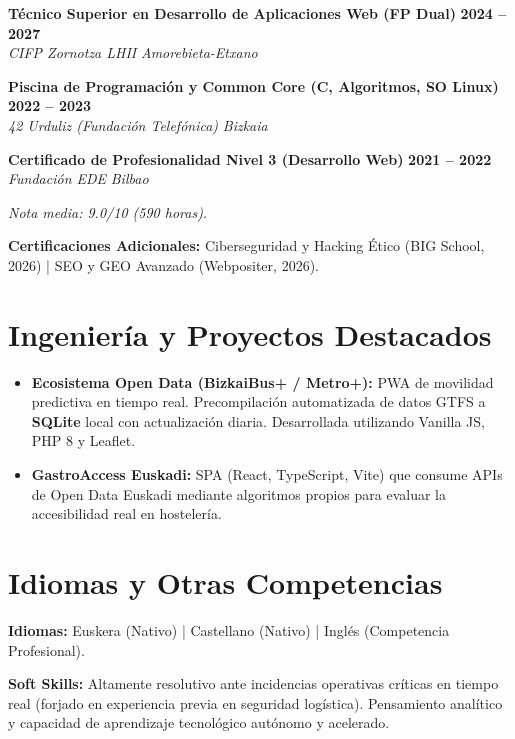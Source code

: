 \documentclass[a4paper,10pt]{article}
\newcommand{\jobheader}[4]{
    \noindent\textbf{#1} \hfill \textbf{#2} \\
    \textit{#3} \hfill \textit{#4} \vspace{3pt}
}
\begin{document}
\jobheader{Técnico Superior en Desarrollo de Aplicaciones Web (FP Dual)}{2024 -- 2027}{CIFP Zornotza LHII}{Amorebieta-Etxano}
\vspace{3pt}

\jobheader{Piscina de Programación y Common Core (C, Algoritmos, SO Linux)}{2022 -- 2023}{42 Urduliz (Fundación Telefónica)}{Bizkaia}
\vspace{3pt}

\jobheader{Certificado de Profesionalidad Nivel 3 (Desarrollo Web)}{2021 -- 2022}{Fundación EDE}{Bilbao}
\small \textit{Nota media: 9.0/10 (590 horas).}
\vspace{4pt}

\noindent \textbf{Certificaciones Adicionales:} Ciberseguridad y Hacking Ético (BIG School, 2026) | SEO y GEO Avanzado (Webpositer, 2026).

\section{Ingeniería y Proyectos Destacados}

\begin{itemize}[leftmargin=12pt, itemsep=4pt, topsep=4pt]
    \item \textbf{Ecosistema Open Data (BizkaiBus+ / Metro+):} PWA de movilidad predictiva en tiempo real. Precompilación automatizada de datos GTFS a \textbf{SQLite} local con actualización diaria. Desarrollada utilizando Vanilla JS, PHP 8 y Leaflet.
    \item \textbf{GastroAccess Euskadi:} SPA (React, TypeScript, Vite) que consume APIs de Open Data Euskadi mediante algoritmos propios para evaluar la accesibilidad real en hostelería.
\end{itemize}

\section{Idiomas y Otras Competencias}

\noindent \textbf{Idiomas:} Euskera (Nativo) | Castellano (Nativo) | Inglés (Competencia Profesional).
\vspace{4pt}

\noindent \textbf{Soft Skills:} Altamente resolutivo ante incidencias operativas críticas en tiempo real (forjado en experiencia previa en seguridad logística). Pensamiento analítico y capacidad de aprendizaje tecnológico autónomo y acelerado.
\end{document}

